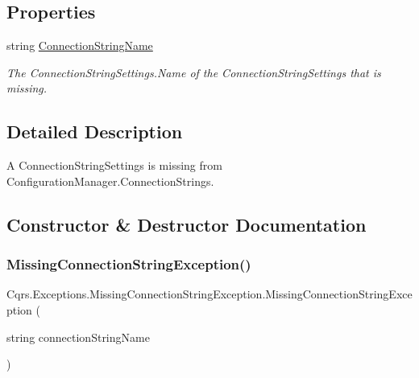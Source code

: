 \subsection*{Properties}
\begin{DoxyCompactItemize}
\item 
string \hyperlink{classCqrs_1_1Exceptions_1_1MissingConnectionStringException_a29ae236586000af84d82272b4723d3f4_a29ae236586000af84d82272b4723d3f4}{Connection\+String\+Name}
\begin{DoxyCompactList}\small\item\em The Connection\+String\+Settings.\+Name of the Connection\+String\+Settings that is missing. \end{DoxyCompactList}\end{DoxyCompactItemize}


\subsection{Detailed Description}
A Connection\+String\+Settings is missing from Configuration\+Manager.\+Connection\+Strings. 



\subsection{Constructor \& Destructor Documentation}
\mbox{\label{classCqrs_1_1Exceptions_1_1MissingConnectionStringException_a7eb344b72528cd591b290891fcedc7e5_a7eb344b72528cd591b290891fcedc7e5}} 
\subsubsection{\texorpdfstring{Missing\+Connection\+String\+Exception()}{MissingConnectionStringException()}\hspace{0.1cm}{\footnotesize\ttfamily [1/2]}}
{\footnotesize\ttfamily Cqrs.\+Exceptions.\+Missing\+Connection\+String\+Exception.\+Missing\+Connection\+String\+Exception (\begin{DoxyParamCaption}\item[{string}]{connection\+String\+Name }\end{DoxyParamCaption})}



